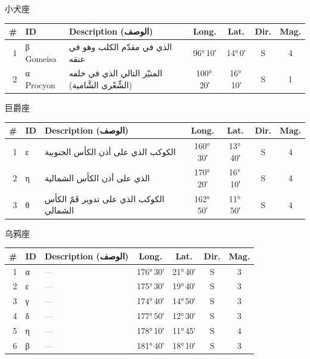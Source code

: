 \documentclass[9pt,a4paper]{extarticle}
\newcommand{\ar}[1]{{\arabicfont\textarabic{#1}}}
\begin{document}
\vspace{4pt}\quad\ar{الكلب الأصغر}\quad 小犬座
\begin{longtable}{r l >{\raggedright\arraybackslash}p{6.7cm} c c c c}
\toprule \# & ID & Description (\ar{الوصف}) & Long. & Lat. & Dir. & Mag.\\ \midrule\endhead
1 & β Gomeisa & \ar{الذي في مقدّم الكلب وهو في عنقه} & 96°\,10′ & 14°\,0′ & S & 4\\
2 & α Procyon & \ar{المنيّر التالي الذي في خلفه (الشِّعْرى الشَّامية)} & 100°\,20′ & 16°\,10′ & S & 1\\
\bottomrule\end{longtable}
\vspace{3pt}\begin{center}\end{center}\vspace{3pt}
\vspace{4pt}\quad\ar{الكأس}\quad 巨爵座
\begin{longtable}{r l >{\raggedright\arraybackslash}p{6.7cm} c c c c}
\toprule \# & ID & Description (\ar{الوصف}) & Long. & Lat. & Dir. & Mag.\\ \midrule\endhead
1 & ε & \ar{الكوكب الذي على أذن الكأس الجنوبية} & 160°\,30′ & 13°\,40′ & S & 4\\
2 & η & \ar{الذي على أذن الكأس الشمالية} & 170°\,20′ & 16°\,10′ & S & 4\\
3 & θ & \ar{الكوكب الذي على تدوير قَمّ الكأس الشمالي} & 162°\,50′ & 11°\,50′ & S & 4\\
\bottomrule\end{longtable}
\vspace{4pt}\quad\ar{الغراب}\quad 乌鸦座
\begin{longtable}{r l >{\raggedright\arraybackslash}p{6.7cm} c c c c}
\toprule \# & ID & Description (\ar{الوصف}) & Long. & Lat. & Dir. & Mag.\\ \midrule\endhead
1 & α & \textcolor{gray}{—} & 176°\,30′ & 21°\,40′ & S & 3\\
2 & ε & \textcolor{gray}{—} & 175°\,30′ & 19°\,40′ & S & 3\\
3 & γ & \textcolor{gray}{—} & 174°\,40′ & 14°\,50′ & S & 3\\
4 & δ & \textcolor{gray}{—} & 177°\,50′ & 12°\,30′ & S & 3\\
5 & η & \textcolor{gray}{—} & 178°\,10′ & 11°\,45′ & S & 4\\
6 & β & \textcolor{gray}{—} & 181°\,40′ & 18°\,10′ & S & 3\\
\bottomrule\end{longtable}
\end{document}
